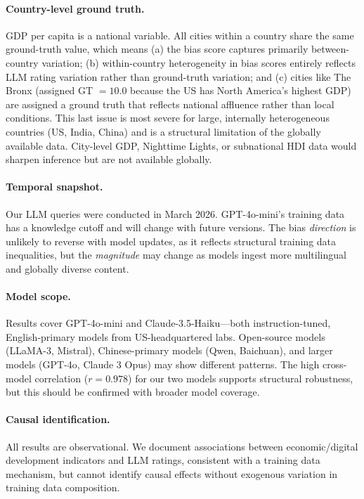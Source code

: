 \documentclass[12pt]{article}
\begin{document}
\paragraph{Country-level ground truth.} GDP per capita is a national variable. All cities within a country share the same ground-truth value, which means (a) the bias score captures primarily between-country variation; (b) within-country heterogeneity in bias scores entirely reflects LLM rating variation rather than ground-truth variation; and (c) cities like The Bronx (assigned GT $= 10.0$ because the US has North America's highest GDP) are assigned a ground truth that reflects national affluence rather than local conditions. This last issue is most severe for large, internally heterogeneous countries (US, India, China) and is a structural limitation of the globally available data. City-level GDP, Nighttime Lights, or subnational HDI data would sharpen inference but are not available globally.

\paragraph{Temporal snapshot.} Our LLM queries were conducted in March 2026. GPT-4o-mini's training data has a knowledge cutoff and will change with future versions. The bias \emph{direction} is unlikely to reverse with model updates, as it reflects structural training data inequalities, but the \emph{magnitude} may change as models ingest more multilingual and globally diverse content.

\paragraph{Model scope.} Results cover GPT-4o-mini and Claude-3.5-Haiku---both instruction-tuned, English-primary models from US-headquartered labs. Open-source models (LLaMA-3, Mistral), Chinese-primary models (Qwen, Baichuan), and larger models (GPT-4o, Claude 3 Opus) may show different patterns. The high cross-model correlation ($r = 0.978$) for our two models supports structural robustness, but this should be confirmed with broader model coverage.

\paragraph{Causal identification.} All results are observational. We document associations between economic/digital development indicators and LLM ratings, consistent with a training data mechanism, but cannot identify causal effects without exogenous variation in training data composition.
\end{document}
